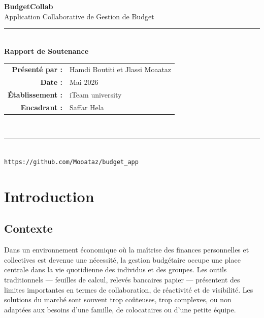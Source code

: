 \documentclass[12pt,a4paper,twoside]{report}
\begin{document}
\begin{titlepage}
  \centering\vspace*{2cm}
  {\Huge\bfseries\color{primaryblue} BudgetCollab}\\[0.5cm]
  {\Large Application Collaborative de Gestion de Budget}\\[1.5cm]
  \rule{0.6\textwidth}{1pt}\\[1cm]
  {\Large\textbf{Rapport de Soutenance}}\\[1cm]
  \begin{minipage}{0.6\textwidth}
    \centering
    \begin{tabular}{rl}
      \textbf{Présenté par :} & Hamdi Boutiti et Jlassi Moaataz \\
      \textbf{Date :} & Mai 2026 \\
      \textbf{Établissement :} & iTeam university \\
      \textbf{Encadrant :} & Saffar Hela \\
    \end{tabular}
  \end{minipage}\\[2cm]
  \rule{0.6\textwidth}{1pt}\\[1cm]
  \vfill
  {\small\textcolor{textsecondary}{\texttt{https://github.com/Mooataz/budget\_app}}}
\end{titlepage}

\tableofcontents
\thispagestyle{empty}
\newpage

\chapter{Introduction}

\section{Contexte}

Dans un environnement économique où la maîtrise des finances personnelles et collectives est devenue une nécessité, la gestion budgétaire occupe une place centrale dans la vie quotidienne des individus et des groupes. Les outils traditionnels — feuilles de calcul, relevés bancaires papier — présentent des limites importantes en termes de collaboration, de réactivité et de visibilité. Les solutions du marché sont souvent trop coûteuses, trop complexes, ou non adaptées aux besoins d'une famille, de colocataires ou d'une petite équipe.
\end{document}
